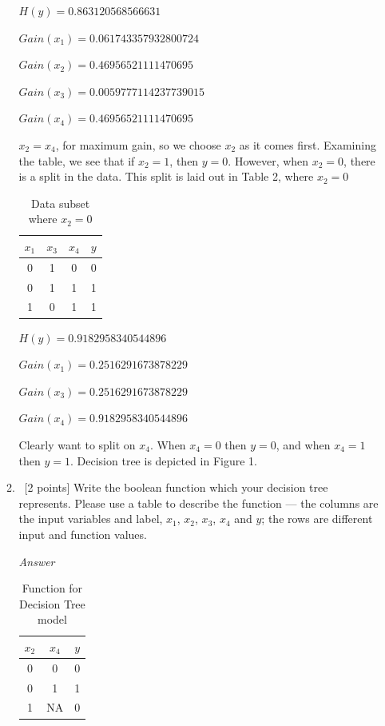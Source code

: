 \documentclass[12pt, fullpage,letterpaper]{article}
\begin{document}
\begin{enumerate}
\begin{enumerate}
$H(y)=0.863120568566631$

$Gain(x_1)=0.061743357932800724$

$Gain(x_2)=0.46956521111470695$

$Gain(x_3)=0.0059777114237739015$

$Gain(x_4)=0.46956521111470695$

$x_2=x_4$, for maximum gain, so we choose $x_2$ as it comes first. Examining the table, we see that if $x_2=1$, then $y=0$. However, when $x_2=0$, there is a split in the data. This split is laid out in Table 2, where $x_2=0$

\begin{table}[h]
	\centering
	\begin{tabular}{ccc|c}
		$x_1$ & $x_3$ & $x_4$ & $y$\\ 
		\hline\hline
		0 & 1 & 0 & 0 \\ \hline
		0 & 1 & 1 & 1 \\ \hline
		1 & 0 & 1 & 1 \\ \hline
	\end{tabular}
	\caption{Data subset where $x_2=0$}
\end{table}

$H(y)=0.9182958340544896$

$Gain(x_1)=0.2516291673878229$

$Gain(x_3)=0.2516291673878229$

$Gain(x_4)=0.9182958340544896$

Clearly want to split on $x_4$. When $x_4=0$ then $y=0$, and when $x_4=1$ then $y=1$. Decision tree is depicted in Figure 1.

\item~[2 points] Write the boolean function which your decision tree represents. Please use a table to describe the function --- the columns are the input variables and label, \ie $x_1$, $x_2$, $x_3$, $x_4$ and $y$; the rows are different input and  function values. 

\emph{Answer}

\begin{table}[h]
	\centering
	\begin{tabular}{cc|c}
		$x_2$ & $x_4$ & $y$\\ 
		\hline\hline
		0 & 0 & 0 \\ \hline
		0 & 1 & 1 \\ \hline
		1 & NA & 0 \\ \hline
	\end{tabular}
	\caption{Function for Decision Tree model}
\end{table}


\end{enumerate}
\end{enumerate}
\end{document}
